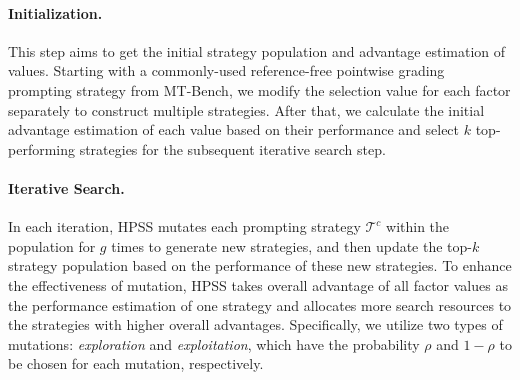 \paragraph{Initialization.} 
This step aims to get the initial strategy population and advantage estimation of values.
Starting with a commonly-used reference-free pointwise grading prompting strategy from MT-Bench, we modify the selection value for each factor separately to construct multiple strategies.
After that, we calculate the initial advantage estimation of each value based on their performance and select $k$ top-performing strategies for the subsequent iterative search step.


\paragraph{Iterative Search.}
In each iteration, HPSS mutates each prompting strategy $\mathcal{T}^{c}$ within the population for $g$ times to generate new strategies, 
and then update the top-$k$ strategy population based on the performance of these new strategies.
To enhance the effectiveness of mutation, HPSS takes overall advantage of all factor values as the performance estimation of one strategy and allocates more search resources to the strategies with higher overall advantages.
Specifically, we utilize two types of mutations: \textit{exploration} and \textit{exploitation}, which have the probability $\rho$ and $ 1 - \rho$ to be chosen for each mutation, respectively.

